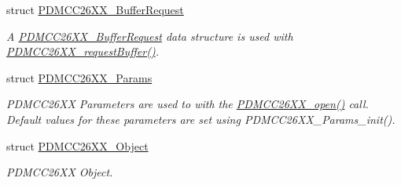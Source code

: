 \begin{DoxyCompactItemize}
struct \hyperlink{struct_p_d_m_c_c26_x_x___buffer_request}{P\+D\+M\+C\+C26\+X\+X\+\_\+\+Buffer\+Request}
\begin{DoxyCompactList}\small\item\em A \hyperlink{struct_p_d_m_c_c26_x_x___buffer_request}{P\+D\+M\+C\+C26\+X\+X\+\_\+\+Buffer\+Request} data structure is used with \hyperlink{_p_d_m_c_c26_x_x_8h_a15a0017513c13ca244f7e3a0f5761e8d}{P\+D\+M\+C\+C26\+X\+X\+\_\+request\+Buffer()}. \end{DoxyCompactList}\item 
struct \hyperlink{struct_p_d_m_c_c26_x_x___params}{P\+D\+M\+C\+C26\+X\+X\+\_\+\+Params}
\begin{DoxyCompactList}\small\item\em P\+D\+M\+C\+C26\+X\+X Parameters are used to with the \hyperlink{_p_d_m_c_c26_x_x_8h_a431d9b71e0d0eebd5ab85960f1c82ee0}{P\+D\+M\+C\+C26\+X\+X\+\_\+open()} call. Default values for these parameters are set using P\+D\+M\+C\+C26\+X\+X\+\_\+\+Params\+\_\+init(). \end{DoxyCompactList}\item 
struct \hyperlink{struct_p_d_m_c_c26_x_x___object}{P\+D\+M\+C\+C26\+X\+X\+\_\+\+Object}
\begin{DoxyCompactList}\small\item\em P\+D\+M\+C\+C26\+X\+X Object. \end{DoxyCompactList}\end{DoxyCompactItemize}
